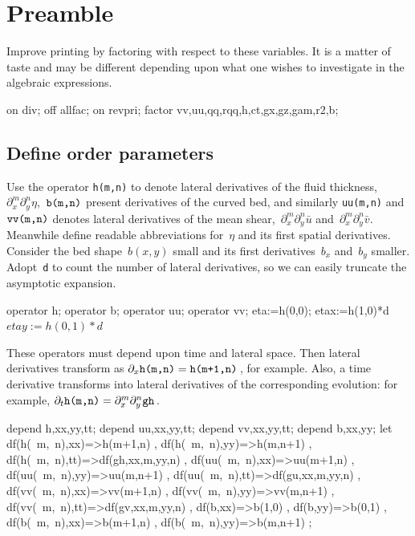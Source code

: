 \documentclass[12pt,a5paper]{article}
\newcommand{\uu}{{\bar u}}
\newcommand{\vv}{{\bar v}}
\begin{document}
\section{Preamble}

Improve printing by factoring with respect to these variables.  It is
a matter of taste and may be different depending upon what one wishes
to investigate in the algebraic expressions.

\begin{reduce}
on div; off allfac; on revpri; 
factor vv,uu,qq,rqq,h,ct,gx,gz,gam,r2,b;
\end{reduce}

\subsection{Define order parameters}

Use the operator \verb|h(m,n)| to denote lateral derivatives of the
fluid thickness,~$\partial_x^m\partial_y^n\eta$,~$\verb|b(m,n)|$ present derivatives of the curved bed, and similarly \verb|uu(m,n)| and~$\verb|vv(m,n)|$ denotes
lateral derivatives of the mean shear,~$\partial_x^m\partial_y^n\uu$ and~$\partial_x^m\partial_y^n\vv$.  Meanwhile define readable abbreviations for~$\eta$ and its first spatial
derivatives. Consider the bed shape~$b(x,y)$ small and its first derivatives~$b_x$ and~$b_y$ smaller. Adopt~\verb|d| to count the number of lateral
 derivatives, so we can easily truncate the asymptotic expansion.

\begin{reduce}
operator h; operator b; operator uu; operator vv;
eta:=h(0,0); etax:=h(1,0)*d$ etay:=h(0,1)*d$
\end{reduce}

These operators must depend upon time and lateral space.  Then lateral
derivatives transform as $\partial_x\verb|h(m,n)|= \verb|h(m+1,n)|$\,, for
example.  Also, a time derivative transforms into lateral
derivatives of the corresponding evolution: for example,
$\partial_t\verb|h(m,n)|= \partial_x^m\partial_y^n\verb|gh|$\,. 

\begin{reduce}
depend h,xx,yy,tt; 
depend uu,xx,yy,tt;
depend vv,xx,yy,tt;
depend b,xx,yy;
let{ df(h(~m,~n),xx)=>h(m+1,n)
    , df(h(~m,~n),yy)=>h(m,n+1)
    , df(h(~m,~n),tt)=>df(gh,xx,m,yy,n)
    , df(uu(~m,~n),xx)=>uu(m+1,n)
    , df(uu(~m,~n),yy)=>uu(m,n+1)
    , df(uu(~m,~n),tt)=>df(gu,xx,m,yy,n)
    , df(vv(~m,~n),xx)=>vv(m+1,n)
    , df(vv(~m,~n),yy)=>vv(m,n+1)
    , df(vv(~m,~n),tt)=>df(gv,xx,m,yy,n) 
    , df(b,xx)=>b(1,0)
    , df(b,yy)=>b(0,1)
    , df(b(~m,~n),xx)=>b(m+1,n)
    , df(b(~m,~n),yy)=>b(m,n+1)  
 };
\end{reduce}
\end{document}

